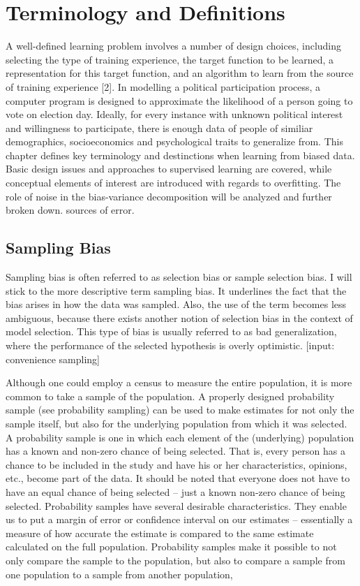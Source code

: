 \section{Terminology and Definitions}

A well-defined learning problem involves a number of design choices, including selecting the type of training experience, the target function to be learned, a representation for this target function, and an algorithm to learn from the source of training experience [2]. In modelling a political participation process, a computer program is designed to approximate the likelihood of a person going to vote on election day. Ideally, for every instance with unknown political interest and willingness to participate, there is enough data of people of similiar demographics, socioeconomics and psychological traits to generalize from. This chapter defines key terminology and destinctions when learning from biased data. Basic design issues and approaches to supervised learning are covered, while conceptual elements of interest are introduced with regards to overfitting. The role of noise in the bias-variance decomposition will be analyzed and further broken down. sources of error.

\subsection{Sampling Bias}

Sampling bias is often referred to as selection bias or sample selection bias. I will stick to the more descriptive term sampling bias. It underlines the fact that the bias arises in how the data was sampled. Also, the use of the term becomes less ambiguous, because there exists another notion of selection bias in the context of model selection. This type of bias is usually referred to as bad generalization, where the performance of the selected hypothesis is overly optimistic. [input: convenience sampling]

Although one could employ a census to measure the entire population, it is more common to take a sample of the population. A properly designed probability sample (see probability sampling) can be used to make estimates for not only the sample itself, but also for the underlying population from which it was selected. A probability sample is one in which each element of the (underlying) population has a known and non-zero chance of being selected. That is, every person has a chance to be included in the study and have his or her characteristics, opinions, etc., become part of the data. It should be noted that everyone does not have to have an equal chance of being selected – just a known non-zero chance of being selected. 
Probability samples have several desirable characteristics. They enable us to put a margin of error or confidence interval on our estimates – essentially a measure of how accurate the estimate is compared to the same estimate calculated on the full population. Probability samples make it possible to not only compare the sample to the population, but also to compare a sample from one population to a sample from another population,

